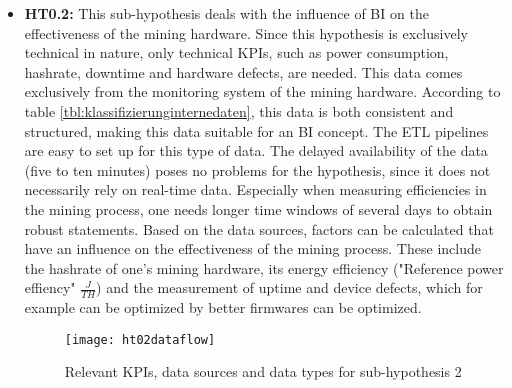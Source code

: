 \begin{itemize}
    \item \textbf{\ac{HT0.2}: }This sub-hypothesis deals with the influence of \ac{BI} on the effectiveness of the
    mining hardware. Since this hypothesis is exclusively technical in nature, only technical \acp{KPI}, such as
    power consumption, hashrate, downtime and hardware defects, are needed. This data comes exclusively from the
    monitoring system of the mining hardware. According to table \ref{tbl:klassifizierunginternedaten}, this data is both
    consistent and structured, making this data suitable for an \ac{BI} concept. The \ac{ETL} pipelines are
    easy to set up for this type of data. The delayed availability of the data (five to ten minutes) poses no
    problems for the hypothesis, since it does not necessarily rely on real-time data. Especially when measuring
    efficiencies in the mining process, one needs longer time windows of several days to obtain robust statements.
    Based on the data sources, factors can be calculated that have an influence on the effectiveness of the mining process.
    These include the hashrate of one's mining hardware, its energy efficiency ("Reference power effiency"
    $\frac{J}{TH}$) and the measurement of uptime and device defects, which for example can be optimized by better firmwares
    can be optimized.

    \begin{figure}[H]
        \caption{Relevant KPIs, data sources and data types for sub-hypothesis 2}
        \texttt{[image: ht02dataflow]}
        \label{figure:ht02dataflow}
    \end{figure}


\end{itemize}
